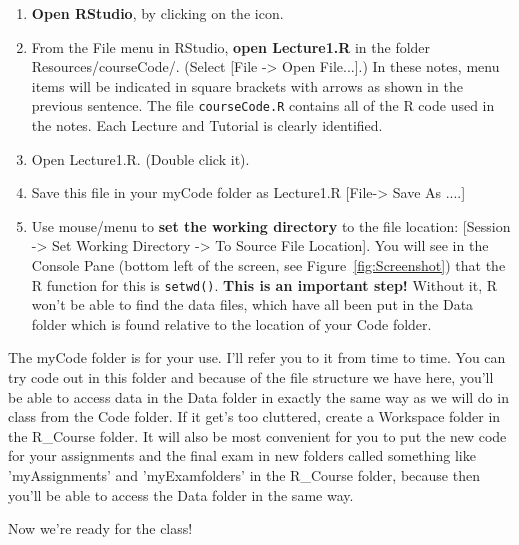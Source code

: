 \documentclass[titlepage]{book}\usepackage{knitr}
\begin{document}
\begin{enumerate}

\item {\textbf{Open RStudio}, by clicking on the icon.}

\item{From the File menu in RStudio, \textbf{open Lecture1.R} in the folder Resources/courseCode/. (Select [File -> Open File...].) In these notes, menu items will be indicated in square brackets with arrows as shown in the previous sentence.  The file \texttt{courseCode.R} contains all of the R code used in the notes.  Each Lecture and Tutorial is clearly identified. } 

\item{Open Lecture1.R. (Double click it). }

\item{Save this file in your myCode folder as Lecture1.R   [File-> Save As ....]}

\item{Use mouse/menu to \textbf{set the working directory} to the file location: [Session -> Set Working Directory -> To Source File Location]. You will see in the Console Pane (bottom left of the screen, see Figure~\ref{fig:Screenshot}) that the R function for this is \texttt{setwd()}.   \textbf{This is an important step!}  Without it, R won't be able to find the data files, which have all been put in the Data folder which is found relative to the location of your Code folder.}

\end{enumerate}

The myCode folder is for your use.  I'll refer you to it from time to time. You can try code out in this folder and because of the file structure we have here, you'll be able to  access data in the Data folder in exactly the same way as we will do in class from the Code folder. If it get's too cluttered, create a Workspace folder in the R\_Course folder.
It will also be most convenient for you to put the new code for your assignments and the final exam in new folders called something like  'myAssignments' and 'myExamfolders' in the R\_Course folder, because then you'll be able to access the Data folder in the same way.

Now we're ready for the class!



\end{document}
